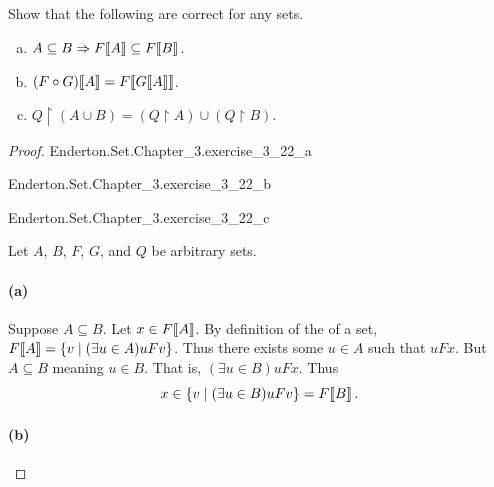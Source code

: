 \documentclass{report}
\begin{document}
\subsection{}%
\label{sub:exercise-3.22}

Show that the following are correct for any sets.

\begin{enumerate}[(a)]
  \item $A \subseteq B \Rightarrow F\!\left\llbracket A\right\rrbracket \subseteq F\!\left\llbracket B\right\rrbracket$.
  \item $(F \circ G)\!\left\llbracket A\right\rrbracket = F\!\left\llbracket G\!\left\llbracket A\right\rrbracket\right\rrbracket$.
  \item $Q \restriction (A \cup B) =
    (Q \restriction A) \cup (Q \restriction B)$.
\end{enumerate}

\begin{proof}

  \statementpadding

    {Enderton.Set.Chapter\_3.exercise\_3\_22\_a}

    {Enderton.Set.Chapter\_3.exercise\_3\_22\_b}

    {Enderton.Set.Chapter\_3.exercise\_3\_22\_c}

  Let $A$, $B$, $F$, $G$, and $Q$ be arbitrary sets.

  \paragraph{(a)}%

    Suppose $A \subseteq B$.
    Let $x \in F\!\left\llbracket A\right\rrbracket$.
    By definition of the  of a set,
      $F\!\left\llbracket A\right\rrbracket = \{v \mid (\exists u \in A) uFv\}$.
    Thus there exists some $u \in A$ such that $uFx$.
    But $A \subseteq B$ meaning $u \in B$.
    That is, $(\exists u \in B)uFx$.
    Thus $$x \in \{v \mid (\exists u \in B)uFv\} = F\!\left\llbracket B\right\rrbracket.$$

  \paragraph{(b)}%


\end{proof}
\end{document}
